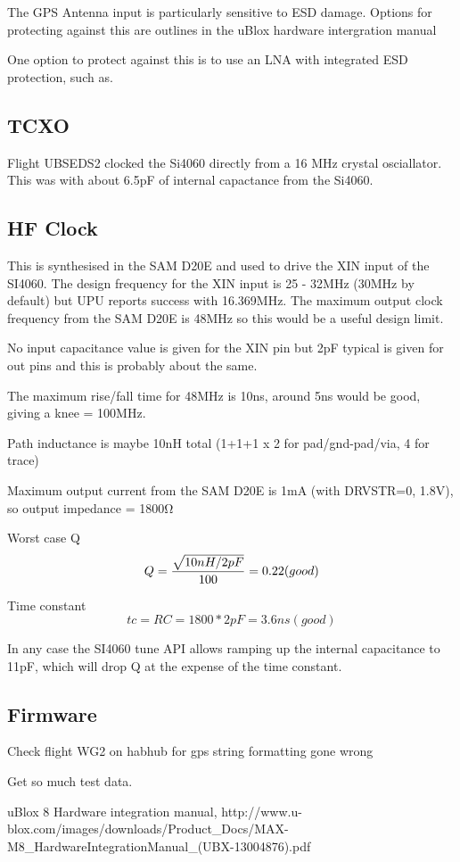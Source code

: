 \documentclass[12pt]{article}
\begin{document}
The GPS Antenna input is particularly sensitive to ESD damage. Options
for protecting against this are outlines in the uBlox hardware
intergration manual 

 One
option to protect against this is to use an LNA with integrated ESD
protection, such as.

\subsection{TCXO}

Flight UBSEDS2 clocked the Si4060 directly from a 16 MHz crystal
osciallator. This was with about 6.5pF of internal capactance from the
Si4060.



\subsection{HF Clock}

This is synthesised in the SAM D20E and used to drive the XIN input of
the SI4060. The design frequency for the XIN input is 25 - 32MHz
(30MHz by default) but UPU reports success with 16.369MHz. The maximum
output clock frequency from the SAM D20E is 48MHz so this would be a
useful design limit.

No input capacitance value is given for the XIN pin but 2pF typical is
given for out pins and this is probably about the same.

The maximum rise/fall time for 48MHz is 10ns, around 5ns would be
good, giving a knee = 100MHz.

Path inductance is maybe 10nH total (1+1+1 x 2 for pad/gnd-pad/via, 4
for trace)

Maximum output current from the SAM D20E is 1mA (with DRVSTR=0, 1.8V),
so output impedance = 1800Ω

Worst case Q
\begin{equation}
  Q = {\sqrt{10nH/2pF} \over 100} = 0.22 (good)
\end{equation}

Time constant
\begin{equation}
  tc = RC = 1800*2pF = 3.6ns (good)
\end{equation}

In any case the SI4060 tune API allows ramping up the internal
capacitance to 11pF, which will drop Q at the expense of the time
constant.

\subsection {Firmware}

Check flight WG2 on habhub for gps string formatting gone wrong

Get so much test data.

\begin{thebibliography}{9}

  uBlox 8 Hardware integration manual,
  http://www.u-blox.com/images/downloads/Product_Docs/MAX-M8_HardwareIntegrationManual_(UBX-13004876).pdf

\end{thebibliography}
\end{document}
